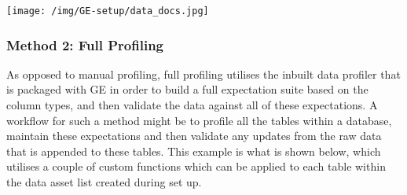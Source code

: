 \documentclass[]{article}
\begin{document}
\texttt{[image: /img/GE-setup/data\_docs.jpg]}

\hypertarget{method-2-full-profiling}{%
\subsubsection{Method 2: Full Profiling}\label{method-2-full-profiling}}

As opposed to manual profiling, full profiling utilises the inbuilt data
profiler that is packaged with GE in order to build a full expectation
suite based on the column types, and then validate the data against all
of these expectations. A workflow for such a method might be to profile
all the tables within a database, maintain these expectations and then
validate any updates from the raw data that is appended to these tables.
This example is what is shown below, which utilises a couple of custom
functions which can be applied to each table within the data asset list
created during set up.
\end{document}
